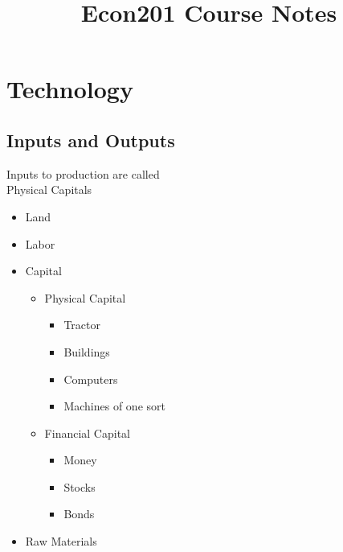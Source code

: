 \documentclass{report}
\title{Econ201 Course Notes}
\begin{document}
\maketitle
\tableofcontents
\chapter{Technology}
\section{Inputs and Outputs}
\begin{defbox}
Inputs to production are called \\Physical Capitals

\end{defbox}

\begin{itemize}
\item Land
\item Labor
\item Capital
\begin{itemize}
\item Physical Capital
\begin{itemize}
\item Tractor
\item Buildings
\item Computers
\item Machines of one sort
\end{itemize}
\item Financial Capital
\begin{itemize}
\item Money
\item Stocks
\item Bonds
\end{itemize}
\end{itemize}
\item Raw Materials
\end{itemize}
\end{document}
